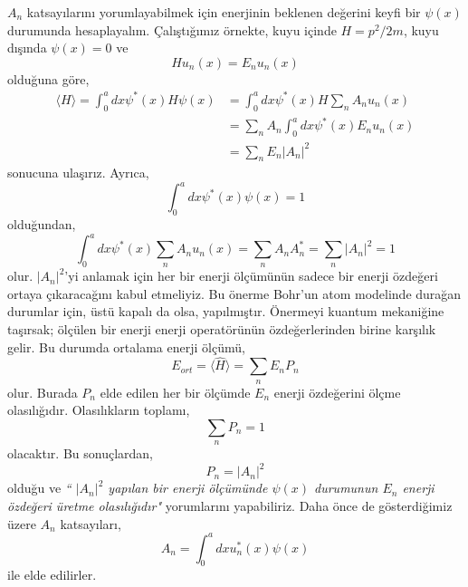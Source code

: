 \documentclass[00_kitap.tex]{subfiles}
\begin{document}
$A_n$ katsayılarını yorumlayabilmek için enerjinin beklenen değerini keyfi bir $\psi(x)$ durumunda hesaplayalım. Çalıştığımız örnekte, kuyu içinde $H=p^2/2m$, kuyu dışında $\psi(x)=0$ ve
\begin{equation}
H u _ { n } ( x ) = E _ { n } u _ { n } ( x )
\end{equation}
olduğuna göre,
\begin{equation}
\begin{aligned} 
\langle H \rangle = \int _ { 0 } ^ { a } d x \psi ^ { * } ( x ) H \psi ( x ) 
& = \int _ { 0 } ^ { a } d x \psi ^ { * } ( x ) H \sum _ { n } A _ { n } u _ { n } ( x ) \\ 
& = \sum _ { n } A _ { n } \int^ { a }_{ 0 } d x \psi ^ { * } ( x ) E _ { n } u _ { n } ( x ) \\ 
& = \sum _ { n } E _ { n } \left| A _ { n } \right| ^ { 2 } 
\end{aligned}
\end{equation}
sonucuna ulaşırız. Ayrıca,
\begin{equation}
\int _ { 0 } ^ { a } d x \psi ^ { * } ( x ) \psi ( x ) = 1
\end{equation}
olduğundan,
\begin{equation}
\int _ { 0 } ^ { a } d x \psi ^ { * } ( x ) \sum _ { n } A _ { n } u _ { n } ( x ) 
= \sum _ { n } A _ { n } A _ { n } ^ { * } 
= \sum _ { n } \left| A _ { n } \right| ^ { 2 } = 1
\end{equation}
olur. $|A_n|^2$'yi anlamak için her bir enerji ölçümünün sadece bir enerji özdeğeri ortaya çıkaracağını kabul etmeliyiz. Bu önerme Bohr'un atom modelinde durağan durumlar için, üstü kapalı da olsa, yapılmıştır. Önermeyi kuantum mekaniğine taşırsak; ölçülen bir enerji enerji operatörünün özdeğerlerinden birine karşılık gelir. Bu durumda ortalama enerji ölçümü,
\begin{equation}
E _ {ort} = \langle \hat H \rangle = \sum _ { n } E _ { n } P _ { n }
\end{equation}
olur. Burada $P_n$ elde edilen her bir ölçümde $E_n$ enerji özdeğerini ölçme olasılığıdır. Olasılıkların toplamı,
\begin{equation}
\sum _ { n } P _ { n } = 1
\end{equation}
olacaktır. Bu sonuçlardan,
\begin{equation}
P_n = |A_n|^2
\end{equation}
olduğu ve \emph{`` $|A_n|^2$ yapılan bir enerji ölçümünde $\psi(x)$ durumunun $E_n$ enerji özdeğeri üretme olasılığıdır"} yorumlarını yapabiliriz. Daha önce de gösterdiğimiz üzere $A_n$ katsayıları,
\begin{equation}
A _ { n } = \int _ { 0 } ^ { a } d x u _ { n } ^ { * } ( x ) \psi ( x )
\end{equation}
ile elde edilirler.
\end{document}
